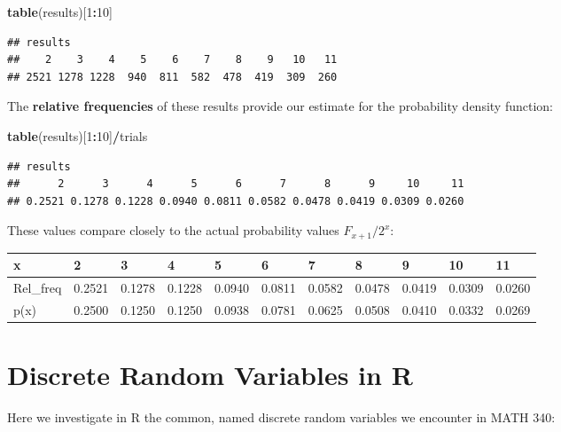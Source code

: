 \documentclass[
]{book}
\newenvironment{Shaded}{\begin{snugshade}}{\end{snugshade}}
\newcommand{\DecValTok}[1]{\textcolor[rgb]{0.00,0.00,0.81}{#1}}
\newcommand{\FunctionTok}[1]{\textcolor[rgb]{0.13,0.29,0.53}{\textbf{#1}}}
\newcommand{\NormalTok}[1]{#1}
\newcommand{\SpecialCharTok}[1]{\textcolor[rgb]{0.81,0.36,0.00}{\textbf{#1}}}
\theoremstyle{definition}
\theoremstyle{definition}
\theoremstyle{definition}
\theoremstyle{definition}
\theoremstyle{remark}
\begin{document}
\begin{Shaded}
\begin{Highlighting}[]
\FunctionTok{table}\NormalTok{(results)[}\DecValTok{1}\SpecialCharTok{:}\DecValTok{10}\NormalTok{]}
\end{Highlighting}
\end{Shaded}

\begin{verbatim}
## results
##    2    3    4    5    6    7    8    9   10   11 
## 2521 1278 1228  940  811  582  478  419  309  260
\end{verbatim}

The \textbf{relative frequencies} of these results provide our estimate for the probability density function:

\begin{Shaded}
\begin{Highlighting}[]
\FunctionTok{table}\NormalTok{(results)[}\DecValTok{1}\SpecialCharTok{:}\DecValTok{10}\NormalTok{]}\SpecialCharTok{/}\NormalTok{trials}
\end{Highlighting}
\end{Shaded}

\begin{verbatim}
## results
##      2      3      4      5      6      7      8      9     10     11 
## 0.2521 0.1278 0.1228 0.0940 0.0811 0.0582 0.0478 0.0419 0.0309 0.0260
\end{verbatim}

These values compare closely to the actual probability values \(F_{x+1}/2^x\):

\begin{table}
\centering
\begin{tabular}{l|l|l|l|l|l|l|l|l|l|l}
\hline
x & 2 & 3 & 4 & 5 & 6 & 7 & 8 & 9 & 10 & 11\\
\hline
Rel\_freq & 0.2521 & 0.1278 & 0.1228 & 0.0940 & 0.0811 & 0.0582 & 0.0478 & 0.0419 & 0.0309 & 0.0260\\
\hline
p(x) & 0.2500 & 0.1250 & 0.1250 & 0.0938 & 0.0781 & 0.0625 & 0.0508 & 0.0410 & 0.0332 & 0.0269\\
\hline
\end{tabular}
\end{table}

\chapter{Discrete Random Variables in R}\label{R-discreteRV}

Here we investigate in R the common, named discrete random variables we encounter in MATH 340:
\end{document}
